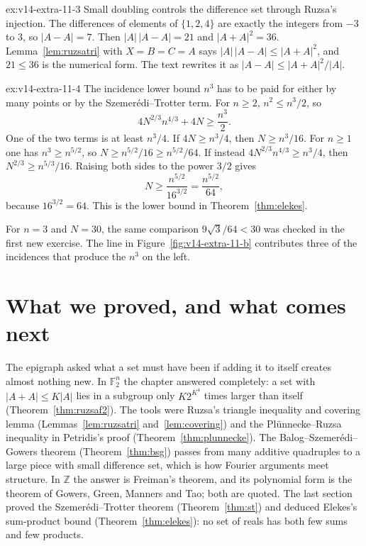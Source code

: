 \begin{solution}{ex:v14-extra-11-3}
\idea Small doubling controls the difference set through Ruzsa's injection.
\writeup The differences of elements of $\{1,2,4\}$ are exactly the integers from $-3$ to $3$, so $|A-A|=7$. Then $|A|\,|A-A|=21$ and $|A+A|^2=36$. Lemma~\ref{lem:ruzsatri} with $X=B=C=A$ says $|A|\,|A-A|\le|A+A|^2$, and $21\le36$ is the numerical form. The text rewrites it as $|A-A|\le|A+A|^2/|A|$.
\end{solution}

\begin{solution}{ex:v14-extra-11-4}
\idea The incidence lower bound $n^3$ has to be paid for either by many points or by the Szemerédi--Trotter term.
\writeup For $n\ge2$, $n^2\le n^3/2$, so
\[
4N^{2/3}n^{4/3}+4N\ge\frac{n^3}2.
\]
One of the two terms is at least $n^3/4$. If $4N\ge n^3/4$, then $N\ge n^3/16$. For $n\ge1$ one has $n^3\ge n^{5/2}$, so $N\ge n^{5/2}/16\ge n^{5/2}/64$. If instead $4N^{2/3}n^{4/3}\ge n^3/4$, then $N^{2/3}\ge n^{5/3}/16$. Raising both sides to the power $3/2$ gives
\[
N\ge\frac{n^{5/2}}{16^{3/2}}=\frac{n^{5/2}}{64},
\]
because $16^{3/2}=64$. This is the lower bound in Theorem~\ref{thm:elekes}.

For $n=3$ and $N=30$, the same comparison $9\sqrt3/64<30$ was checked in the first new exercise. The line in Figure~\ref{fig:v14-extra-11-b} contributes three of the incidences that produce the $n^3$ on the left.
\end{solution}

\section{What we proved, and what comes next}

The epigraph asked what a set must have been if adding it to itself creates almost nothing new. In $\mathbb F_2^n$ the chapter answered completely: a set with $|A+A|\le K|A|$ lies in a subgroup only $K2^{K^4}$ times larger than itself (Theorem~\ref{thm:ruzsaf2}). The tools were Ruzsa's triangle inequality and covering lemma (Lemmas~\ref{lem:ruzsatri} and~\ref{lem:covering}) and the Plünnecke--Ruzsa inequality in Petridis's proof (Theorem~\ref{thm:plunnecke}). The Balog--Szemerédi--Gowers theorem (Theorem~\ref{thm:bsg}) passes from many additive quadruples to a large piece with small difference set, which is how Fourier arguments meet structure. In $\mathbb Z$ the answer is Freiman's theorem, and its polynomial form is the theorem of Gowers, Green, Manners and Tao; both are quoted. The last section proved the Szemerédi--Trotter theorem (Theorem~\ref{thm:st}) and deduced Elekes's sum-product bound (Theorem~\ref{thm:elekes}): no set of reals has both few sums and few products.

